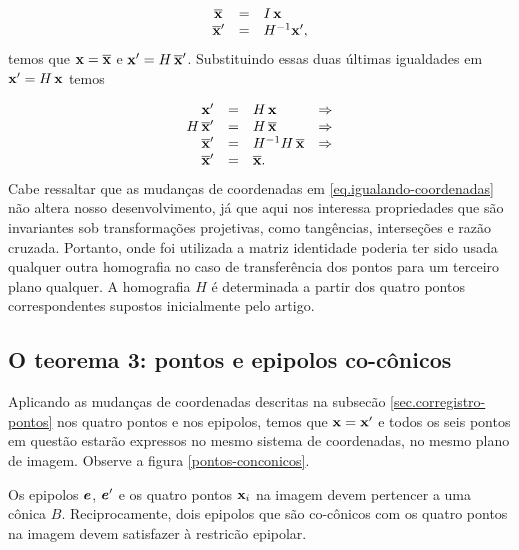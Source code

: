\begin{equation}\label{eq.igualando-coordenadas}
\begin{array}{rcl}
\overline{\mathbf{x}}\,&=&I\,\mathbf{x}\\
\overline{\mathbf{x}}'&=&H^{-1}\mathbf{x}',
\end{array}
\end{equation}
temos que $\mathbf{x}=\overline{\mathbf{x}}$ e $\mathbf{x}'=H\,\overline{\mathbf{x}}'$. Substituindo essas duas últimas igualdades em $\mathbf{x}'=H\,\mathbf{x}$ temos

\begin{equation*}
\begin{array}{rcll}
\mathbf{x}'&=&H\,\mathbf{x}&\Rightarrow\\
H\,\overline{\mathbf{x}}'&=&H\,\overline{\mathbf{x}}&\Rightarrow\\
\overline{\mathbf{x}}'&=&H^{-1}H\,\overline{\mathbf{x}}&\Rightarrow\\
\overline{\mathbf{x}}'&=&\overline{\mathbf{x}}.&
\end{array}
\end{equation*}
Cabe ressaltar que as mudanças de coordenadas em \ref{eq.igualando-coordenadas} não altera nosso desenvolvimento, já que aqui nos interessa propriedades que são invariantes sob transformações projetivas, como tangências, interseções e raz\~ao cruzada. Portanto, onde foi utilizada a matriz identidade poderia ter sido usada qualquer outra homografia no caso de transferência dos pontos para um terceiro plano qualquer. A homografia $H$ é determinada a partir dos quatro pontos correspondentes supostos inicialmente pelo artigo.

\subsection{O teorema 3: pontos e epipolos co-cônicos}\label{sec.teorema-3}

Aplicando as mudanças de coordenadas descritas na subsec\~ao \ref{sec.corregistro-pontos} nos quatro pontos e nos epipolos, temos que $\mathbf{x}=\mathbf{x}'$ e todos os seis pontos em questão estarão expressos no mesmo sistema de coordenadas, no mesmo plano de imagem. Observe a figura \ref{pontos-conconicos}.

\begin{teorema}
Os epipolos $\boldsymbol{e}$, $\boldsymbol{e}'$ e os quatro pontos $\mathbf{x}_i$ na imagem devem pertencer a uma cônica $B$. Reciprocamente, dois epipolos que são co-cônicos com os quatro pontos na imagem devem satisfazer à restricão epipolar.
\end{teorema}

